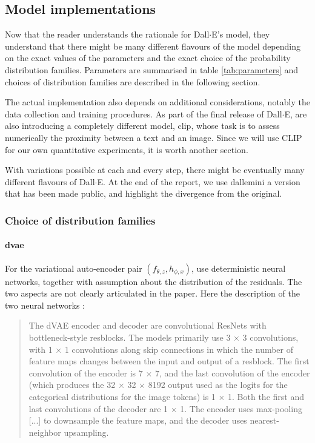 \documentclass{article}
\begin{document}
\begin{multicols}{2}
\subsection{Model implementations}

Now that the reader understands the rationale for Dall$\cdot$E's model, they understand that there might be many different flavours of the model depending on the exact values of the parameters and the exact choice of the probability distribution families. Parameters are summarised in table \ref{tab:parameters} and choices of distribution families are described in the following section.

The actual implementation also depends on additional considerations, notably the data collection and training procedures. As part of the final release of Dall$\cdot$E, \citeauthor{zeroshot} are also introducing a completely different model, \gls{clip}, whose task is to assess numerically the proximity between a text and an image. Since we will use CLIP for our own quantitative experiments, it is worth another section.

With variations possible at each and every step, there might be eventually many different flavours of Dall$\cdot$E. At the end of the report, we use \gls{dallemini} a version that has been made public, and highlight the divergence from the original.

\subsubsection{Choice of distribution families}

\paragraph{\gls{dvae}} \label{sec:dvae}

For the variational auto-encoder pair $(f_{\theta,z}, h_{\phi,x})$, \citeauthor{zeroshot} use deterministic neural networks, together with assumption about the distribution of the residuals. The two aspects are not clearly articulated in the paper. Here the description of the two neural networks :

\blockquote{The dVAE encoder and decoder are convolutional ResNets with bottleneck-style resblocks. The models primarily use 3 × 3 convolutions, with 1 × 1 convolutions along skip connections in which the number of feature maps changes between the input and output of a resblock. The first convolution of the encoder is 7 × 7, and the last convolution of the encoder (which produces the 32 × 32 × 8192 output used as the logits for the categorical distributions for the image tokens) is 1 × 1. Both the first and last convolutions of the decoder are 1 × 1. The encoder uses max-pooling [...] to downsample the feature maps, and the decoder uses nearest-neighbor upsampling.}


\end{multicols}
\end{document}
